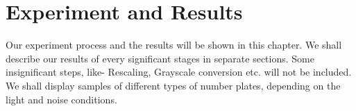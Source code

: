 \documentclass{standalone}
\begin{document}
\chapter{Experiment and Results}
Our experiment process and the results will be shown in this chapter. We shall describe our results of every significant stages in separate sections. Some insignificant steps, like- Rescaling, Grayscale conversion etc. will not be included.  We shall display samples of different types of number plates, depending on the light and noise conditions.
\end{document}
